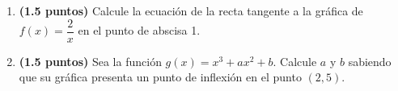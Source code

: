 
\begin{enumerate}[label=\alph*)]
\item \textbf{(1.5 puntos)} Calcule la ecuación de la recta tangente a la gráfica de $f(x)=\dfrac{2}{x}$ en el punto de abscisa 1.
\item \textbf{(1.5 puntos)} Sea la función $g(x)=x^3+ax^2+b$. Calcule $a$ y $b$ sabiendo que su gráfica presenta un punto de inflexión en el punto $(2,5)$.
\end{enumerate}
